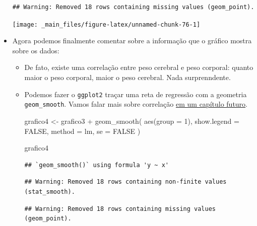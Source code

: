 \documentclass[
  11pt]{report}
\newenvironment{Shaded}{\begin{snugshade}}{\end{snugshade}}
\newcommand{\AttributeTok}[1]{\textcolor[rgb]{0.77,0.63,0.00}{#1}}
\newcommand{\ConstantTok}[1]{\textcolor[rgb]{0.00,0.00,0.00}{#1}}
\newcommand{\DecValTok}[1]{\textcolor[rgb]{0.00,0.00,0.81}{#1}}
\newcommand{\FunctionTok}[1]{\textcolor[rgb]{0.00,0.00,0.00}{#1}}
\newcommand{\NormalTok}[1]{#1}
\newcommand{\OtherTok}[1]{\textcolor[rgb]{0.56,0.35,0.01}{#1}}
\newcommand{\SpecialCharTok}[1]{\textcolor[rgb]{0.00,0.00,0.00}{#1}}
\newcommand{\StringTok}[1]{\textcolor[rgb]{0.31,0.60,0.02}{#1}}
\renewenvironment{Shaded}{
    \begin{mdframed}[%
      roundcorner=2pt,%
      innerleftmargin=5pt,%
      innerrightmargin=5pt,%
      topline=true,%
      leftline=true,%
      rightline=true,%
      bottomline=true,%
      linewidth=0.5pt,%
      linecolor=black!20,%
      backgroundcolor=black!2,%
      skipabove=2ex,%
      skipbelow=2.5ex%
    ]%
  }
  {
    \end{mdframed}
  }
\begin{document}
\begin{itemize}
\begin{verbatim}
## Warning: Removed 18 rows containing missing values (geom_point).
\end{verbatim}

  \begin{center}\texttt{[image: \_main\_files/figure-latex/unnamed-chunk-76-1]} \end{center}
\item
  Agora podemos finalmente comentar sobre a informação que o gráfico mostra sobre os dados:

  \begin{itemize}
  \item
    De fato, existe uma correlação entre peso cerebral e peso corporal: quanto maior o peso corporal, maior o peso cerebral. Nada surprenndente.
  \item
    \protect\hypertarget{grafico4}{}{} Podemos fazer o \texttt{ggplot2} traçar uma reta de regressão com a geometria \texttt{geom\_smooth}. Vamos falar mais sobre correlação \protect\hyperlink{correlacao}{em um capítulo futuro}.

\begin{Shaded}
\begin{Highlighting}[]
\NormalTok{grafico4 }\OtherTok{\textless{}{-}}\NormalTok{ grafico3 }\SpecialCharTok{+}
  \FunctionTok{geom\_smooth}\NormalTok{(}
    \FunctionTok{aes}\NormalTok{(}\AttributeTok{group =} \DecValTok{1}\NormalTok{), }
    \AttributeTok{show.legend =} \ConstantTok{FALSE}\NormalTok{,}
    \AttributeTok{method =} \StringTok{\textquotesingle{}lm\textquotesingle{}}\NormalTok{, }
    \AttributeTok{se =} \ConstantTok{FALSE}
\NormalTok{  )}

\NormalTok{grafico4}
\end{Highlighting}
\end{Shaded}

\begin{verbatim}
## `geom_smooth()` using formula 'y ~ x'
\end{verbatim}

\begin{verbatim}
## Warning: Removed 18 rows containing non-finite values (stat_smooth).
\end{verbatim}

\begin{verbatim}
## Warning: Removed 18 rows containing missing values (geom_point).
\end{verbatim}


\end{itemize}
\end{itemize}
\end{document}
